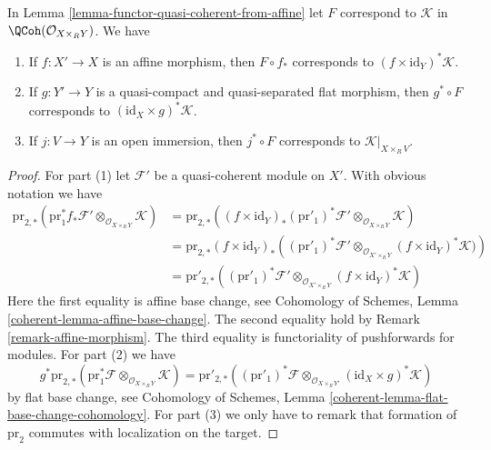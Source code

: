 \begin{lemma}
\label{lemma-functor-quasi-coherent-from-affine-compose}
In Lemma \ref{lemma-functor-quasi-coherent-from-affine} let $F$
correspond to $\mathcal{K}$ in $\QCoh(\mathcal{O}_{X \times_R Y})$.
We have
\begin{enumerate}
\item If $f : X' \to X$ is an affine morphism, then $F \circ f_*$
corresponds to $(f \times \text{id}_Y)^*\mathcal{K}$.
\item If $g : Y' \to Y$ is a quasi-compact and quasi-separated flat
morphism, then $g^* \circ F$ corresponds to
$(\text{id}_X \times g)^*\mathcal{K}$.
\item If $j : V \to Y$ is an open immersion, then $j^* \circ F$
corresponds to $\mathcal{K}|_{X \times_R V}$.
\end{enumerate}
\end{lemma}

\begin{proof}
For part (1) let $\mathcal{F}'$ be a quasi-coherent module on $X'$.
With obvious notation we have
\begin{align*}
\text{pr}_{2, *}(\text{pr}_1^*f_*\mathcal{F}'
\otimes_{\mathcal{O}_{X \times_R Y}} \mathcal{K})
& =
\text{pr}_{2, *}((f \times \text{id}_Y)_*
(\text{pr}'_1)^*\mathcal{F}'
\otimes_{\mathcal{O}_{X \times_R Y}} \mathcal{K}) \\
& =
\text{pr}_{2, *}(f \times \text{id}_Y)_*
\left((\text{pr}'_1)^*\mathcal{F}'
\otimes_{\mathcal{O}_{X' \times_R Y}}
(f \times \text{id}_Y)^*\mathcal{K})\right)  \\
& =
\text{pr}'_{2, *}((\text{pr}'_1)^*\mathcal{F}'
\otimes_{\mathcal{O}_{X' \times_R Y}} (f \times \text{id}_Y)^*\mathcal{K})
\end{align*}
Here the first equality is affine base change, see
Cohomology of Schemes, Lemma \ref{coherent-lemma-affine-base-change}.
The second equality hold by Remark \ref{remark-affine-morphism}.
The third equality is functoriality of pushforwards for modules.
For part (2) we have
$$
g^*\text{pr}_{2, *}(\text{pr}_1^*\mathcal{F}
\otimes_{\mathcal{O}_{X \times_R Y}} \mathcal{K}) =
\text{pr}'_{2, *}((\text{pr}'_1)^*\mathcal{F}
\otimes_{\mathcal{O}_{X \times_R Y'}}
(\text{id}_X \times g)^*\mathcal{K})
$$
by flat base change, see
Cohomology of Schemes, Lemma \ref{coherent-lemma-flat-base-change-cohomology}.
For part (3) we only have to remark that formation of
$\text{pr}_2$ commutes with localization on the target.
\end{proof}


